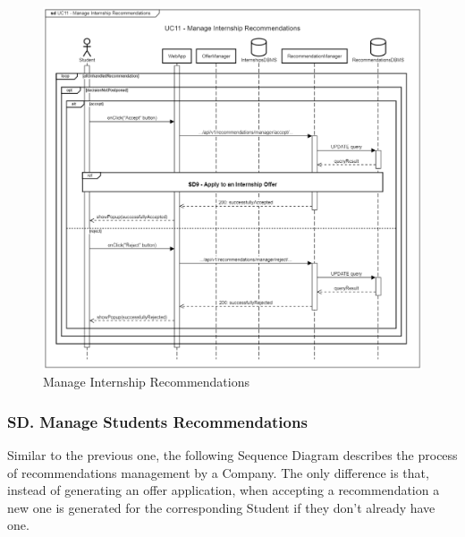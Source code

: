 \begin{figure}[H]
    \begin{center}
         \includegraphics[width=0.9\linewidth]{LaTeXCode/images/SequenceDiagrams/UC11-sequenceDiagram.png}
         \caption{Manage Internship Recommendations}
         \label{fig:manage_internship_recommendations_sd}
     \end{center}
\end{figure}

\subsubsection*{SD\cuc. Manage Students Recommendations}
\label{subsubsec:manage_students_recommendations_sd}
Similar to the previous one, the following Sequence Diagram describes the process of recommendations management by a Company. The only difference is that, instead of generating an offer application, when accepting a recommendation a new one is generated for the corresponding Student if they don't already have one.


